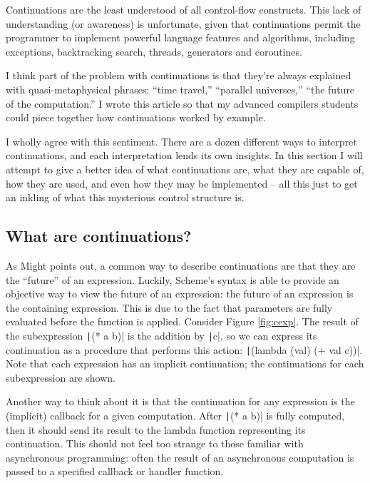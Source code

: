 \documentclass[]{article}
\begin{document}
\begin{displayquote}
  Continuations are the least understood of all control-flow constructs. This lack of understanding (or awareness) is unfortunate, given that continuations permit the programmer to implement powerful language features and algorithms, including exceptions, backtracking search, threads, generators and coroutines.

  I think part of the problem with continuations is that they're always explained with quasi-metaphysical phrases: ``time travel,'' ``parallel universes,'' ``the future of the computation.'' I wrote this article so that my advanced compilers students could piece together how continuations worked by example.
\end{displayquote}

I wholly agree with this sentiment. There are a dozen different ways to interpret continuations, and each interpretation lends its own insights. In this section I will attempt to give a better idea of what continuations are, what they are capable of, how they are used, and even how they may be implemented -- all this just to get an inkling of what this mysterious control structure is.

\subsection{What are continuations?}
\label{sec:what}

As Might points out, a common way to describe continuations are that they are the ``future'' of an expression. Luckily, Scheme's syntax is able to provide an objective way to view the future of an expression: the future of an expression is the containing expression. This is due to the fact that parameters are fully evaluated before the function is applied. Consider Figure \ref{fig:cexp}. The result of the subexpression \texttt|(* a b)| is the addition by \texttt|c|, so we can express its continuation as a procedure that performs this action: \texttt|(lambda (val) (+ val c))|. Note that each expression has an implicit continuation; the continuations for each subexpression are shown.

Another way to think about it is that the continuation for any expression is the (implicit) callback for a given computation. After \texttt|(* a b)| is fully computed, then it should send its result to the lambda function representing its continuation. This should not feel too strange to those familiar with asynchronous programming: often the result of an asynchronous computation is passed to a specified callback or handler function.
\end{document}
